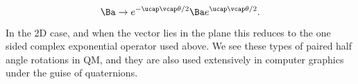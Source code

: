 \begin{equation}\label{eqn:gaQuickIntro:210}
\Ba \rightarrow
e^{-\ucap \vcap \theta/2}
\Ba
e^{\ucap \vcap \theta/2}.
\end{equation}



In the 2D case, and when the vector lies in the plane this reduces to the one sided complex exponential operator used above.  We see these types of paired half angle rotations in QM, and they are also used extensively in computer graphics under the guise of quaternions.
